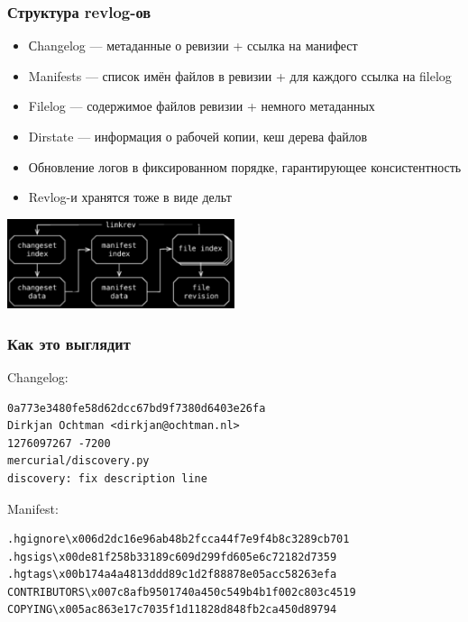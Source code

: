 \documentclass{../cscslides}
\begin{document}
    \begin{frame}
        \frametitle{Структура revlog-ов}
        \begin{itemize}
            \item Сhangelog --- метаданные о ревизии + ссылка на манифест
            \item Manifests --- список имён файлов в ревизии + для каждого ссылка на filelog
            \item Filelog --- содержимое файлов ревизии + немного метаданных
            \item Dirstate --- информация о рабочей копии, кеш дерева файлов
            \item Обновление логов в фиксированном порядке, гарантирующее консистентность
            \item Revlog-и хранятся тоже в виде дельт
        \end{itemize}
        \begin{center}
            \includegraphics[width=0.5\textwidth]{mercurialLogStructureBlack.png}
        \end{center}
    \end{frame}

    \begin{frame}[fragile]
        \frametitle{Как это выглядит}
        Changelog:
        \begin{verbatim}
0a773e3480fe58d62dcc67bd9f7380d6403e26fa
Dirkjan Ochtman <dirkjan@ochtman.nl>
1276097267 -7200
mercurial/discovery.py
discovery: fix description line
        \end{verbatim}
        \vspace{3mm}
        Manifest:
        \begin{verbatim}
.hgignore\x006d2dc16e96ab48b2fcca44f7e9f4b8c3289cb701
.hgsigs\x00de81f258b33189c609d299fd605e6c72182d7359
.hgtags\x00b174a4a4813ddd89c1d2f88878e05acc58263efa
CONTRIBUTORS\x007c8afb9501740a450c549b4b1f002c803c4519
COPYING\x005ac863e17c7035f1d11828d848fb2ca450d89794
        \end{verbatim}
    \end{frame}
\end{document}
